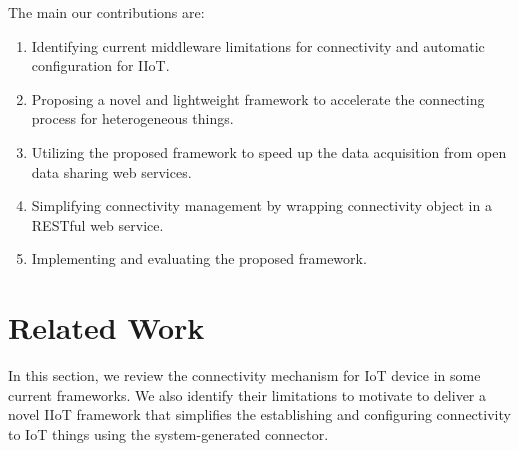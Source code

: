 The main our contributions are:
\begin{enumerate}
    \item Identifying current middleware limitations for connectivity and automatic configuration for IIoT.
    \item Proposing a novel and lightweight framework to accelerate the connecting process for heterogeneous things.
    \item Utilizing the proposed framework to speed up the data acquisition from open data sharing web services.
    \item Simplifying connectivity management by wrapping connectivity object in a RESTful web service.
    \item Implementing and evaluating the proposed framework.
\end{enumerate}

\section{Related Work}
In this section, we review the connectivity mechanism for IoT device in some current frameworks. We also identify their limitations to motivate to deliver a novel IIoT framework that simplifies the establishing and configuring connectivity to IoT things using the system-generated connector.

